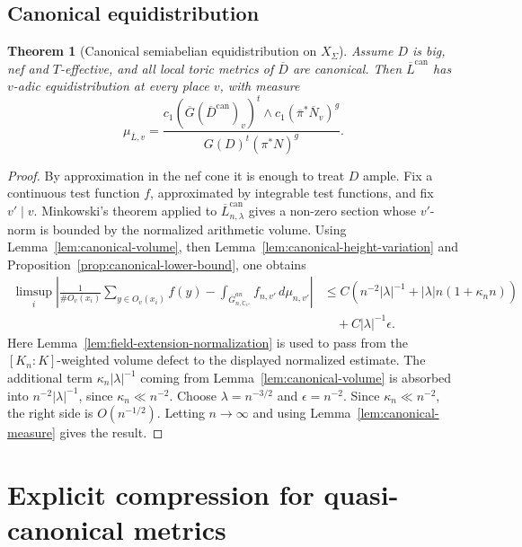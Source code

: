 \documentclass[10pt,a4paper]{amsart}
\theoremstyle{plain}
\newtheorem{theorem}{Theorem}
\theoremstyle{plain}
\numberwithin{equation}{section}
\providecommand{\ol}{\overline}
\providecommand{\can}{\operatorname{can}}
\begin{document}
\subsection{Canonical equidistribution}

\begin{theorem}[Canonical semiabelian equidistribution on \(X_\Sigma\)]
	\label{thm:canonical-eq}
	Assume \(D\) is big, nef and \(T\)-effective, and all local toric metrics of
	\(\ol D\) are canonical.  Then \(\ol L^{\can}\) has \(v\)-adic
	equidistribution at every place \(v\), with measure
	\[
	\mu_{\ol L,v}
	=
	\frac{
		c_1(\ol G(\ol D^{\can})_v)^t\wedge c_1(\ol\pi^*\ol N_v)^g
	}{
		G(D)^t(\pi^*N)^g
	}.
	\]
\end{theorem}

\begin{proof}
	By approximation in the nef cone it is enough to treat \(D\) ample.  Fix a
	continuous test function \(f\), approximated by integrable test functions, and
	fix \(v'\mid v\).  Minkowski's theorem applied to
	\(\ol L_{n,\lambda}^{\can}\) gives a non-zero section whose \(v'\)-norm is
	bounded by the normalized arithmetic volume.  Using
	Lemma~\ref{lem:canonical-volume}, then Lemma~\ref{lem:canonical-height-variation}
	and Proposition~\ref{prop:canonical-lower-bound}, one obtains
	\[
	\begin{aligned}
		\limsup_i\left|
		\frac{1}{\#O_v(x_i)}
		\sum_{y\in O_v(x_i)}f(y)
		-
		\int_{\ol G_{n,\mathbb{C}_{v'}}^{an}} f_{n,v'}\,d\mu_{n,v'}
		\right|
		&\le
		C\left(n^{-2}|\lambda|^{-1}+|\lambda|n(1+\kappa_n n)\right)\\
		&\quad +C|\lambda|^{-1}\epsilon .
	\end{aligned}
	\]
	Here Lemma~\ref{lem:field-extension-normalization} is used to pass from the
	\([K_n:K]\)-weighted volume defect to the displayed normalized estimate.
	The additional term \(\kappa_n|\lambda|^{-1}\) coming from
	Lemma~\ref{lem:canonical-volume} is absorbed into
	\(n^{-2}|\lambda|^{-1}\), since \(\kappa_n\ll n^{-2}\).
	Choose \(\lambda=n^{-3/2}\) and \(\epsilon=n^{-2}\).  Since
	\(\kappa_n\ll n^{-2}\), the right side is \(O(n^{-1/2})\).  Letting
	\(n\to\infty\) and using Lemma~\ref{lem:canonical-measure} gives the result.
\end{proof}

\section{Explicit compression for quasi-canonical metrics}
\end{document}
